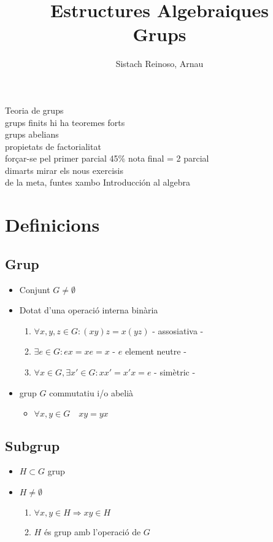 \documentclass{article}
\title{Estructures Algebraiques\\Grups}
\author{Sistach Reinoso, Arnau}
\begin{document}
\maketitle
Teoria de grups\\
grups finits hi ha teoremes forts\\
grups abelians\\
propietats de factorialitat\\
forçar-se pel primer parcial 45\% nota final = 2 parcial\\
dimarts mirar els nous exercisis\\
de la meta, funtes xambo Introducción al algebra\\
\newpage

\section{Definicions}
\subsection{Grup}
\begin{itemize}
\item Conjunt $G \neq \emptyset$
\item Dotat d'una operació interna binària
	\begin{enumerate}
	\item $\forall x, y, z \in G : (xy)z = x(yz) $ - assosiativa -
	\item $\exists e \in G: ex = xe = x$ - $e$ element neutre -
	\item $\forall x \in G, \exists x' \in G: xx' = x'x = e$ - simètric -
	\end{enumerate}
\item grup $G$ commutatiu i/o abelià
	\begin{itemize}
	\item $\forall x, y \in G\quad xy = yx$
	\end{itemize}
\end{itemize}
\subsection{Subgrup}
\begin{itemize}
\item $H \subset G$ grup
\item $H \neq \emptyset$
	\begin{enumerate}
	\item $\forall x, y \in H \Rightarrow xy \in H$
	\item $H$ és grup amb l'operació de $G$
	\end{enumerate}
\end{itemize}
\end{document}
